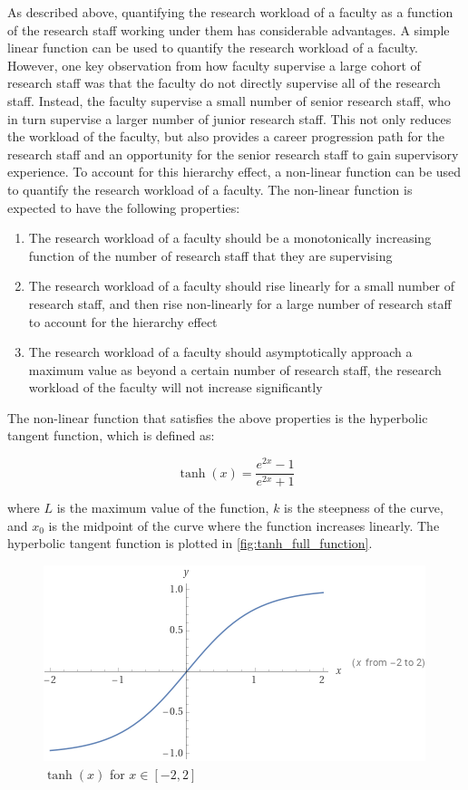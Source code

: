 As described above, quantifying the research workload of a faculty as a function of the research staff working under them has considerable advantages. A simple linear function can be used to quantify the research workload of a faculty. However, one key observation from how faculty supervise a large cohort of research staff was that the faculty do not directly supervise all of the research staff. Instead, the faculty supervise a small number of senior research staff, who in turn supervise a larger number of junior research staff. This not only reduces the workload of the faculty, but also provides a career progression path for the research staff and an opportunity for the senior research staff to gain supervisory experience. To account for this hierarchy effect, a non-linear function can be used to quantify the research workload of a faculty. The non-linear function is expected to have the following properties:

\begin{enumerate}

  \item The research workload of a faculty should be a monotonically increasing function of the number of research staff that they are supervising
  \item The research workload of a faculty should rise linearly for a small number of research staff, and then rise non-linearly for a large number of research staff to account for the hierarchy effect
  \item The research workload of a faculty should asymptotically approach a maximum value as beyond a certain number of research staff, the research workload of the faculty will not increase significantly

\end{enumerate}

The non-linear function that satisfies the above properties is the hyperbolic tangent function, which is defined as:

\begin{equation*}
  \tanh(x) = \frac{e^{2x} - 1}{e^{2x} + 1}
\end{equation*}

where $L$ is the maximum value of the function, $k$ is the steepness of the curve, and $x_0$ is the midpoint of the curve where the function increases linearly. The hyperbolic tangent function is plotted in \autoref{fig:tanh_full_function}.

\begin{figure}[htpb]
  \centering
  \includegraphics[width=0.5\linewidth]{images/tanh_fullplot.png}
  \caption{\(\tanh(x)\) for \(x \in [-2, 2]\)}
  \label{fig:tanh_full_function}
\end{figure}

